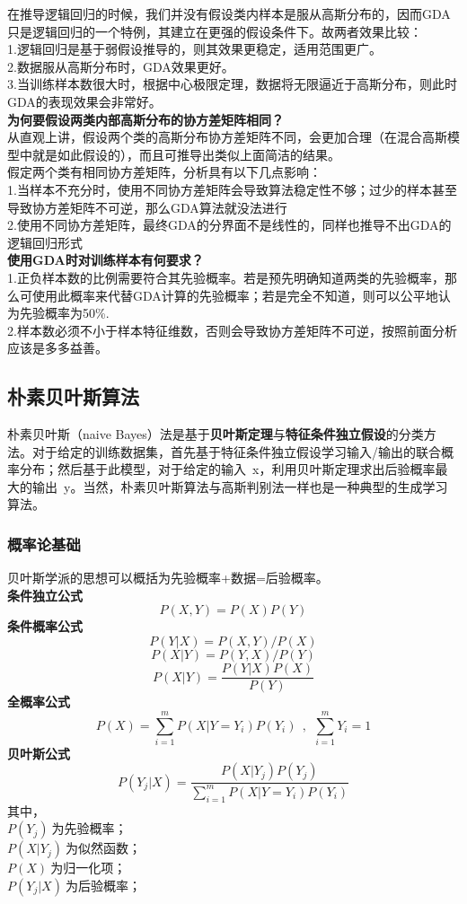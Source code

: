 在推导逻辑回归的时候，我们并没有假设类内样本是服从高斯分布的，因而GDA只是逻辑回归的一个特例，其建立在更强的假设条件下。故两者效果比较：\\
1.逻辑回归是基于弱假设推导的，则其效果更稳定，适用范围更广。\\
2.数据服从高斯分布时，GDA效果更好。\\
3.当训练样本数很大时，根据中心极限定理，数据将无限逼近于高斯分布，则此时GDA的表现效果会非常好。\\

\noindent\textbf{为何要假设两类内部高斯分布的协方差矩阵相同？}\\
从直观上讲，假设两个类的高斯分布协方差矩阵不同，会更加合理（在混合高斯模型中就是如此假设的），而且可推导出类似上面简洁的结果。\\
假定两个类有相同协方差矩阵，分析具有以下几点影响：\\
1.当样本不充分时，使用不同协方差矩阵会导致算法稳定性不够；过少的样本甚至导致协方差矩阵不可逆，那么GDA算法就没法进行\\
2.使用不同协方差矩阵，最终GDA的分界面不是线性的，同样也推导不出GDA的逻辑回归形式\\

\noindent\textbf{使用GDA时对训练样本有何要求？}\\
1.正负样本数的比例需要符合其先验概率。若是预先明确知道两类的先验概率，那么可使用此概率来代替GDA计算的先验概率；若是完全不知道，则可以公平地认为先验概率为50\%.\\
2.样本数必须不小于样本特征维数，否则会导致协方差矩阵不可逆，按照前面分析应该是多多益善。

\newpage
\subsection{朴素贝叶斯算法}
朴素贝叶斯（naive Bayes）法是基于\textbf{贝叶斯定理}与\textbf{特征条件独立假设}的分类方法。对于给定的训练数据集，首先基于特征条件独立假设学习输入/输出的联合概率分布；然后基于此模型，对于给定的输入~x，利用贝叶斯定理求出后验概率最大的输出~y。当然，朴素贝叶斯算法与高斯判别法一样也是一种典型的生成学习算法。

\subsubsection{概率论基础}
贝叶斯学派的思想可以概括为先验概率+数据=后验概率。\\
\noindent\textbf{条件独立公式}\\
$$P(X,Y)=P(X)P(Y)$$
\noindent\textbf{条件概率公式}\\
$$P(Y|X)=P(X,Y)/P(X)$$
$$P(X|Y)=P(Y,X)/P(Y)$$
$$P(X|Y)=\frac{P(Y|X)P(X)}{P(Y)}$$
\noindent\textbf{全概率公式}\\
$$P(X)=\sum_{i=1}^{m}P(X|Y=Y_i)P(Y_i)~~,~~\sum_{i=1}^{m}Y_i=1$$
\noindent\textbf{贝叶斯公式}\\
$$P(Y_j|X)=\frac{P(X|Y_j)P(Y_j)}{\sum_{i=1}^{m}P(X|Y=Y_i)P(Y_i)}$$
其中，\\
$P(Y_j)~$为先验概率；\\
$P(X|Y_j)~$为似然函数；\\
$P(X)~$为归一化项；\\
$P(Y_j|X)~$为后验概率；\\

